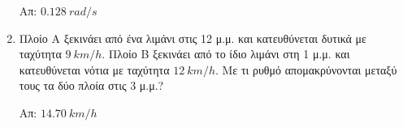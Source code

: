 \begin{enumerate}
		\hfill Απ: $\SI{0.128}{rad/s}$

	\item  Πλοίο Α ξεκινάει από ένα λιμάνι στις 12 μ.μ. και κατευθύνεται δυτικά
		με ταχύτητα  $\SI{9}{km/h}$. Πλοίο Β ξεκινάει από το ίδιο λιμάνι στη 1
		μ.μ. και κατευθύνεται νότια με ταχύτητα $\SI{12}{km/h}$. Με τι ρυθμό
		απομακρύνονται μεταξύ τους τα δύο πλοία στις 3 μ.μ.?

		\hfill Απ: $\SI{14,70}{km/h}$

\end{enumerate}



